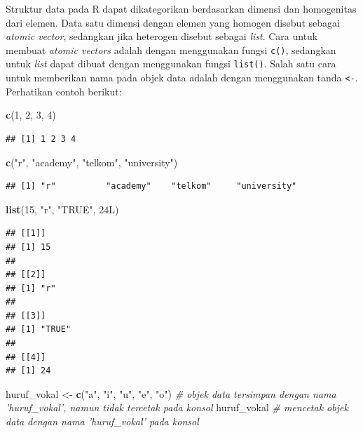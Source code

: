 \documentclass[]{article}
\newenvironment{Shaded}{\begin{snugshade}}{\end{snugshade}}
\newcommand{\CommentTok}[1]{\textcolor[rgb]{0.56,0.35,0.01}{\textit{#1}}}
\newcommand{\DecValTok}[1]{\textcolor[rgb]{0.00,0.00,0.81}{#1}}
\newcommand{\KeywordTok}[1]{\textcolor[rgb]{0.13,0.29,0.53}{\textbf{#1}}}
\newcommand{\NormalTok}[1]{#1}
\newcommand{\StringTok}[1]{\textcolor[rgb]{0.31,0.60,0.02}{#1}}
\begin{document}
Struktur data pada R dapat dikategorikan berdasarkan dimensi dan
homogenitas dari elemen. Data satu dimensi dengan elemen yang homogen
disebut sebagai \emph{atomic vector}, sedangkan jika heterogen disebut
sebagai \emph{list}. Cara untuk membuat \emph{atomic vectors} adalah
dengan menggunakan fungsi \texttt{c()}, sedangkan untuk \emph{list}
dapat dibuat dengan menggunakan fungsi \texttt{list()}. Salah satu cara
untuk memberikan nama pada objek data adalah dengan menggunakan tanda
\texttt{\textless{}-}. Perhatikan contoh berikut:

\begin{Shaded}
\begin{Highlighting}[]
\KeywordTok{c}\NormalTok{(}\DecValTok{1}\NormalTok{, }\DecValTok{2}\NormalTok{, }\DecValTok{3}\NormalTok{, }\DecValTok{4}\NormalTok{)}
\end{Highlighting}
\end{Shaded}

\begin{verbatim}
## [1] 1 2 3 4
\end{verbatim}

\begin{Shaded}
\begin{Highlighting}[]
\KeywordTok{c}\NormalTok{(}\StringTok{"r"}\NormalTok{, }\StringTok{"academy"}\NormalTok{, }\StringTok{"telkom"}\NormalTok{, }\StringTok{"university"}\NormalTok{)}
\end{Highlighting}
\end{Shaded}

\begin{verbatim}
## [1] "r"          "academy"    "telkom"     "university"
\end{verbatim}

\begin{Shaded}
\begin{Highlighting}[]
\KeywordTok{list}\NormalTok{(}\DecValTok{15}\NormalTok{, }\StringTok{"r"}\NormalTok{, }\StringTok{"TRUE"}\NormalTok{, 24L)}
\end{Highlighting}
\end{Shaded}

\begin{verbatim}
## [[1]]
## [1] 15
## 
## [[2]]
## [1] "r"
## 
## [[3]]
## [1] "TRUE"
## 
## [[4]]
## [1] 24
\end{verbatim}

\begin{Shaded}
\begin{Highlighting}[]
\NormalTok{huruf_vokal <-}\StringTok{ }\KeywordTok{c}\NormalTok{(}\StringTok{"a"}\NormalTok{, }\StringTok{"i"}\NormalTok{, }\StringTok{"u"}\NormalTok{, }\StringTok{"e"}\NormalTok{, }\StringTok{"o"}\NormalTok{) }\CommentTok{# objek data tersimpan dengan nama 'huruf_vokal', namun tidak tercetak pada konsol}
\NormalTok{huruf_vokal }\CommentTok{# mencetak objek data dengan nama 'huruf_vokal' pada konsol}
\end{Highlighting}
\end{Shaded}
\end{document}
